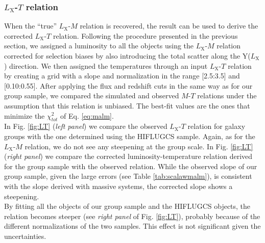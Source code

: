 \documentclass{aa} %
\begin{document}
\subsubsection{$L_{\text{X}}$-$T$ relation}
When the ``true'' $L_{\text{X}}$-$M$ relation is recovered, the result can be
used to derive the corrected $L_{\text{X}}$-$T$ relation. Following
the procedure presented in the previous section, we assigned a luminosity to all the
objects using the $L_{\text{X}}$-$M$ relation corrected for selection biases 
 by also introducing the total scatter
along the Y($L_{\text{X}}$) direction. We then assigned the temperatures through an
input $L_{\text{X}}$-$T$ relation by creating a grid with a slope and normalization in
the range [2.5:3.5] and [0.10:0.55]. After applying the flux and
redshift cuts in the same way as for our group sample, we compared the simulated
and observed $M$-$T$ relations under the assumption that this relation
is unbiased. The best-fit values are the ones that minimize the
$\chi^2_{tot}$ of Eq. \ref{eq:malm}.\\
In Fig. \ref{fig:LT} ({\it left panel}) we compare the observed $L_{\text{X}}$-$T$ relation for galaxy groups with the one determined using the HIFLUGCS sample. Again, as for the $L_{\text{X}}$-$M$ relation, we do not see any steepening at the group scale. In Fig. \ref{fig:LT} ({\it right panel}) we compare the corrected
luminosity-temperature relation derived for the group sample with the
observed relation. While the observed slope of our group sample, given the large errors (see Table \ref{tab:scalawmalm}), is consistent with the slope derived with massive systems, the
corrected slope shows a steepening.\\
By fitting all the objects of our group sample and the HIFLUGCS objects, the relation becomes steeper (see {\it right panel} of Fig. \ref{fig:LT}), probably because of the different normalizations of the two samples. This effect is not significant given the uncertainties. 
\end{document}
